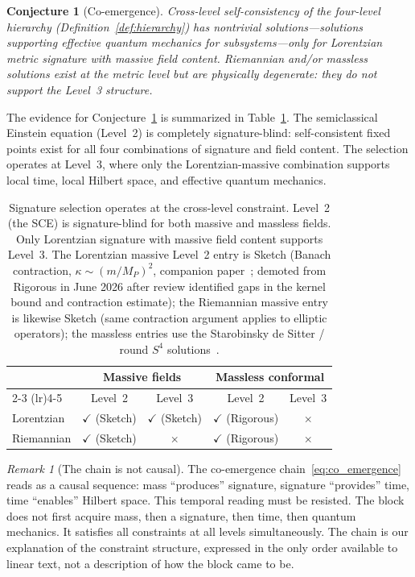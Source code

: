 \documentclass[12pt,a4paper]{article}
\newtheorem{conjecture}{Conjecture}
\theoremstyle{definition}
\theoremstyle{remark}
\newtheorem{remark}{Remark}
\begin{document}
\begin{conjecture}[Co-emergence]
\label{conj:coemergence}
Cross-level self-consistency of the four-level hierarchy
(Definition~\ref{def:hierarchy}) has nontrivial solutions---solutions
supporting effective quantum mechanics for subsystems---only for
Lorentzian metric signature with massive field content. Riemannian
and/or massless solutions exist at the metric level but are physically
degenerate: they do not support the Level~3 structure.
\end{conjecture}

The evidence for Conjecture~\ref{conj:coemergence} is summarized in
Table~\ref{tab:signature}. The semiclassical Einstein equation (Level~2)
is completely signature-blind: self-consistent fixed points exist for
all four combinations of signature and field content. The selection
operates at Level~3, where only the Lorentzian-massive combination
supports local time, local Hilbert space, and effective quantum
mechanics.

\begin{table}[h]
\centering
\begin{tabular}{lcccc}
\toprule
& \multicolumn{2}{c}{Massive fields} & \multicolumn{2}{c}{Massless conformal} \\
\cmidrule(lr){2-3} \cmidrule(lr){4-5}
& Level~2 & Level~3 & Level~2 & Level~3 \\
\midrule
Lorentzian & $\checkmark$ (Sketch) & $\checkmark$ (Sketch) & $\checkmark$ (Rigorous) & $\times$ \\
Riemannian & $\checkmark$ (Sketch) & $\times$ & $\checkmark$ (Rigorous) & $\times$ \\
\bottomrule
\end{tabular}
\caption{Signature selection operates at the cross-level constraint. Level~2
(the SCE) is signature-blind for both massive and massless fields. Only
Lorentzian signature with massive field content supports Level~3.
The Lorentzian massive Level~2 entry is Sketch (Banach contraction,
$\kappa \sim (m/M_P)^2$, companion paper~\cite{fixed_point}; demoted
from Rigorous in June 2026 after review identified gaps in the kernel
bound and contraction estimate); the
Riemannian massive entry is likewise Sketch (same contraction argument applies to
elliptic operators); the massless entries use the Starobinsky de Sitter /
round $S^4$ solutions~\cite{starobinsky,bunch_davies}.}
\label{tab:signature}
\end{table}

\begin{remark}[The chain is not causal]
\label{rem:temporal}
The co-emergence chain~\eqref{eq:co_emergence} reads as a causal
sequence: mass ``produces'' signature, signature ``provides'' time, time
``enables'' Hilbert space. This temporal reading must be resisted. The
block does not first acquire mass, then a signature, then time, then
quantum mechanics. It satisfies all constraints at all levels
simultaneously. The chain is our explanation of the constraint structure,
expressed in the only order available to linear text, not a description
of how the block came to be.
\end{remark}
\end{document}
